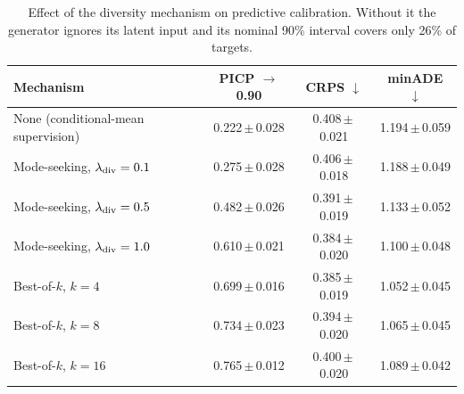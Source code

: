 \begin{table}[!t]
\centering
\caption{Effect of the diversity mechanism on predictive calibration. Without it the generator ignores its latent input and its nominal 90\% interval covers only 26\% of targets.}
\label{tab:diversity}
\begin{tabular}{lccc}
\toprule
Mechanism & PICP $\rightarrow$0.90 & CRPS $\downarrow$ & minADE $\downarrow$ \\
\midrule
None (conditional-mean supervision) & 0.222\,$\pm$\,0.028 & 0.408\,$\pm$\,0.021 & 1.194\,$\pm$\,0.059 \\
Mode-seeking, $\lambda_{\rm div}=0.1$ & 0.275\,$\pm$\,0.028 & 0.406\,$\pm$\,0.018 & 1.188\,$\pm$\,0.049 \\
Mode-seeking, $\lambda_{\rm div}=0.5$ & 0.482\,$\pm$\,0.026 & 0.391\,$\pm$\,0.019 & 1.133\,$\pm$\,0.052 \\
Mode-seeking, $\lambda_{\rm div}=1.0$ & 0.610\,$\pm$\,0.021 & 0.384\,$\pm$\,0.020 & 1.100\,$\pm$\,0.048 \\
Best-of-$k$, $k=4$ & 0.699\,$\pm$\,0.016 & 0.385\,$\pm$\,0.019 & 1.052\,$\pm$\,0.045 \\
Best-of-$k$, $k=8$ & 0.734\,$\pm$\,0.023 & 0.394\,$\pm$\,0.020 & 1.065\,$\pm$\,0.045 \\
Best-of-$k$, $k=16$ & 0.765\,$\pm$\,0.012 & 0.400\,$\pm$\,0.020 & 1.089\,$\pm$\,0.042 \\
\bottomrule
\end{tabular}
\end{table}
